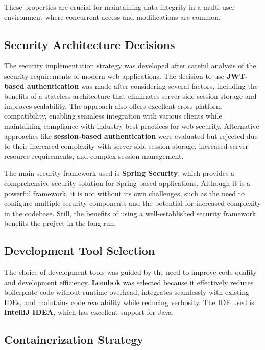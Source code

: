 These properties are crucial for maintaining data integrity in a multi-user environment where concurrent access and modifications are common.

\subsection{Security Architecture Decisions}\label{subsec:security-decisions}

The security implementation strategy was developed after careful analysis of the security requirements of modern web applications.
The decision to use \textbf{JWT-based authentication} was made after considering several factors, including the benefits of a stateless architecture that eliminates server-side session storage and improves scalability.
The approach also offers excellent cross-platform compatibility, enabling seamless integration with various clients while maintaining compliance with industry best practices for web security.
Alternative approaches like \textbf{session-based authentication} were evaluated but rejected due to their increased complexity with server-side session storage, increased server resource requirements, and complex session management.


The main security framework used is \textbf{Spring Security}, which provides a comprehensive security solution for Spring-based applications.
Although it is a powerful framework, it is not without its own challenges, such as the need to configure multiple security components and the potential for increased complexity in the codebase.
Still, the benefits of using a well-established security framework benefits the project in the long run.
\subsection{Development Tool Selection}\label{subsec:tool-selection}

The choice of development tools was guided by the need to improve code quality and development efficiency.
\textbf{Lombok} was selected because it effectively reduces boilerplate code without runtime overhead, integrates seamlessly with existing IDEs, and maintains code readability while reducing verbosity.
The IDE used is \textbf{IntelliJ IDEA}, which has excellent support for Java.

\subsection{Containerization Strategy}\label{subsec:containerization}

